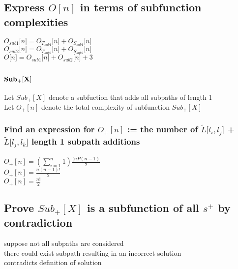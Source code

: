 \documentclass[11pt]{article}
\begin{document}
\subsection{Express $O[n]$ in terms of subfunction complexities}
\begin{center}
$
O_{sub1}\lbrack n \rbrack = O_{T_{sub1}}\lbrack n \rbrack + O_{S_{sub1}}\lbrack n \rbrack
$
\\ \vspace{2mm}
$
O_{sub2}\lbrack n \rbrack = O_{T_{sub2}}\lbrack n \rbrack + O_{S_{sub2}}\lbrack n \rbrack
$
\\ \vspace{2mm}
$
O\lbrack n \rbrack = O_{sub1}\lbrack n \rbrack + O_{sub2}\lbrack n \rbrack + 3
$
\end{center}







\subsection{$\bold{Sub_+[X]}$}
Let $Sub_+[X]$ denote a subfuction that adds all subpaths of length 1\\
Let $O_+[n]$ denote the total complexity of subfunction $Sub_+[X]$

\subsubsection{Find an expression for $O_+[n]$ := the number of $\tilde{L} \lbrack l_i,l_j \rbrack$ + $\tilde{L} \lbrack l_j,l_k \rbrack$  length 1 subpath additions}
\begin{center}
\vspace{2mm}
$
O_+[n] = (\sum_{i=1}^n 1)\frac{(n P (n-1)}{2}
$
\\ \vspace{2mm}
$
O_+[n] = \frac{n(n-1)!}{2}
$
\\ \vspace{2mm}
$
O_+[n] = \frac{n!}{2}
$
\end{center}






\subsection{Prove $Sub_+[X]$ is a subfunction of all $s^+$ by contradiction}
suppose not all subpaths are considered\\
there could exist subpath resulting in an incorrect solution\\
contradicts definition of solution\\
\end{document}
